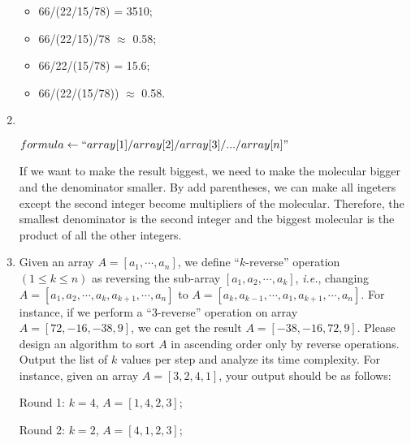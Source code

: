 \documentclass[12pt,a4paper]{article}
\makeatletter
\newtheorem*{solution}{Solution}
\theoremstyle{definition}
\renewenvironment{solution}[1][Solution] {\par\pushQED{\qed}\normalfont\topsep6\p@\@plus6\p@\relax\trivlist\item[\hskip\labelsep\bfseries#1\@addpunct{.}]\ignorespaces}{\popQED\endtrivlist\@endpefalse} \makeatother
\makeatother
\begin{document}
\begin{enumerate}
\begin{itemize}
        \item 66/(22/15/78) = 3510; 
        
        \item 66/(22/15)/78 $\approx$ 0.58;
        
        \item 66/22/(15/78) = 15.6; 

        \item 66/(22/(15/78)) $\approx$ 0.58.
    \end{itemize}
   \begin{solution}
   	\quad \\
        \begin{algorithm}[H]
        	\BlankLine
        	\caption{$maxquot(array[1,...,n])$} \label{Alg-div}
        	$formula \leftarrow ``array[1]/array[2]/array[3]/.../array[n]"$ \;
        	{
        	}
        	\;
        \end{algorithm}
    If we want to make the result biggest, we need to make the molecular bigger and the denominator smaller. By add parentheses, we can make all ingeters except the second integer become multipliers of the molecular. Therefore, the smallest denominator is the second integer and the biggest molecular is the product of all the other integers.
    \end{solution}




    \item
   Given an array $A=[a_1, \cdots, a_n]$, we define ``$k$-reverse'' operation $(1 \leq k \leq n)$ as reversing the sub-array $[a_1, a_2, \cdots, a_k]$, \textit{i.e.}, changing $A=[a_1, a_2, \cdots, a_k, a_{k+1}, \cdots, a_n]$ to $A=[a_k, a_{k-1}, \cdots, a_1, a_{k+1}, \cdots, a_n]$. For instance, if we perform a ``$3$-reverse'' operation on array $A=[72,-16,-38,9]$, we can get the result $A=[-38,-16,72,9]$. Please design an algorithm to sort $A$ in ascending order only by reverse operations. Output the list of $k$ values per step and analyze its time complexity. For instance, given an array $A=[3,2,4,1]$, your output should be as follows:
   
   Round 1: $k=4$, $A=[1, 4, 2, 3]$;
   
   Round 2: $k=2$, $A=[4, 1, 2, 3]$;
   

\end{enumerate}
\end{document}
